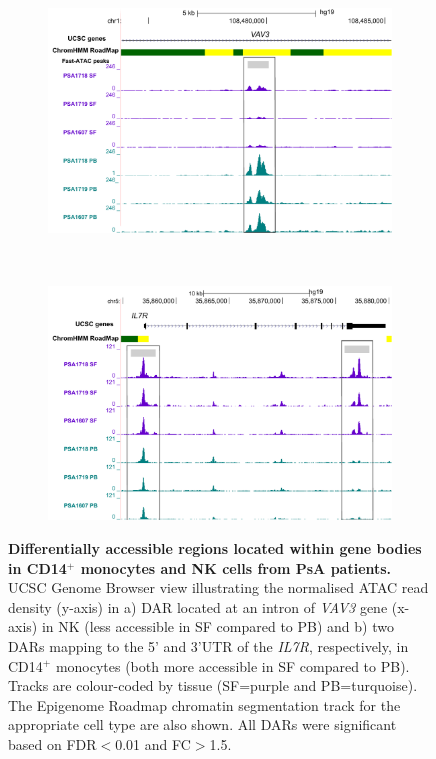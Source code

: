 \bigskip
\begin{figure}[H]
\centering
\begin{subfigure}[b]{0.60\textwidth}
\centering 
\includegraphics[width=\textwidth]{./Results3/pdfs/ATAC_PSA_NK_VAV3}
\caption{}
\end{subfigure}
~
\begin{subfigure}[b]{0.60\textwidth} 
\centering
\includegraphics[width=\textwidth]{./Results3/pdfs/ATAC_PSA_CD14_IL7R}
\caption{}
\end{subfigure}
\caption[Differentially accessible regions located within gene bodies in CD14$^+$ monocytes and NK cells from PsA patients.]{\textbf{Differentially accessible regions located within gene bodies in CD14$^+$ monocytes and NK cells from PsA patients.} UCSC Genome Browser view illustrating the normalised ATAC read density (y-axis) in a) DAR located at an intron of \textit{VAV3} gene (x-axis) in NK (less accessible in SF compared to PB) and b) two DARs mapping to the 5' and 3'UTR of the \textit{IL7R}, respectively, in CD14$^+$ monocytes (both more accessible in SF compared to PB). Tracks are colour-coded by tissue (SF=purple and PB=turquoise). The Epigenome Roadmap chromatin segmentation track for the appropriate cell type are also shown. All DARs were significant based on FDR$<$0.01 and FC$>$1.5.}
\label{figure:PsA_FAST_ATAC_gene_boy_DOCS_CD14_NK}
\end{figure}




